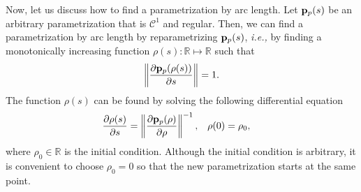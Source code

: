 Now, let us discuss how to find a parametrization by arc length.
Let $\mathbf{p}_p(s)$ be an arbitrary parametrization that is $\mathcal{C}^1$ and regular.
Then, we can find a parametrization by arc length by reparametrizing $\mathbf{p}_p(s)$, \emph{i.e.,} by finding a monotonically increasing function $\rho(s) : \mathbb{R} \mapsto \mathbb{R}$ such that
\begin{equation}
    \left\|\frac{\partial \mathbf{p}_p(\rho(s))}{\partial s}\right\| = 1.
\end{equation}
The function $\rho(s)$ can be found by solving the following differential equation
\begin{align}
    \frac{\partial \rho(s)}{\partial s} &= \left\|\frac{\partial \mathbf{p}_p(\rho)}{\partial \rho}\right\|^{-1}, &
    \rho(0) &= \rho_0,
\end{align}
where $\rho_0 \in \mathbb{R}$ is the initial condition.
Although the initial condition is arbitrary, it is convenient to choose $\rho_0 = 0$ so that the new parametrization starts at the same point.
